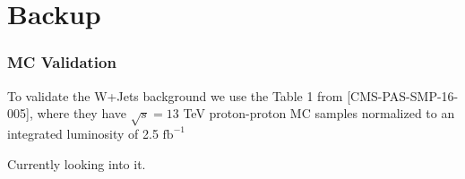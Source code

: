 \documentclass{beamer}
\begin{document}
\ThankYouFrame

\section{Backup}
\begin{frame}
\frametitle{MC Validation}
{\justifying
To validate the W+Jets background we use the Table 1 from [CMS-PAS-SMP-16-005], where they have ${\sqrt{s}=13}$ TeV proton-proton MC samples normalized to an
integrated luminosity of 2.5 $ \text{fb}^{-1}$
}
\begin{table}[]
	\caption{{\scriptsize  Number of events simulation as a function of the exclusive jet multiplicity. Events are required to have exactly one muon and one or more jets for the $W \rightarrow \mu\nu +jets$ production, muons are required to have $p_T > 25$ GeV and $|\eta| < 2.4$, and jets are required to have $p_T > 30$ GeV, and last $M_T > 50$ GeV}}
\end{table}

Currently looking into it.

\end{frame}
\end{document}
